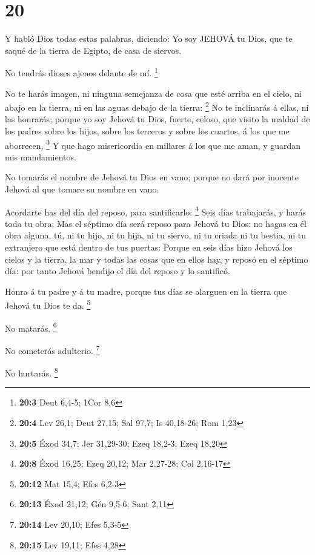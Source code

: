 \hypertarget{section-19}{%
\section{20}\label{section-19}}

 Y habló Dios todas estas palabras, diciendo: 
Yo soy JEHOVÁ tu Dios, que te saqué de la tierra de Egipto, de casa de
siervos.

 No tendrás dioses ajenos delante de mí. \footnote{\textbf{20:3}
  Deut 6,4-5; 1Cor 8,6}

 No te harás imagen, ni ninguna semejanza de cosa que esté
arriba en el cielo, ni abajo en la tierra, ni en las aguas debajo de la
tierra: \footnote{\textbf{20:4} Lev 26,1; Deut 27,15; Sal 97,7; Is
  40,18-26; Rom 1,23}  No te inclinarás á ellas, ni las
honrarás; porque yo soy Jehová tu Dios, fuerte, celoso, que visito la
maldad de los padres sobre los hijos, sobre los terceros y sobre los
cuartos, á los que me aborrecen, \footnote{\textbf{20:5} Éxod 34,7; Jer
  31,29-30; Ezeq 18,2-3; Ezeq 18,20}  Y que hago
misericordia en millares á los que me aman, y guardan mis mandamientos.

 No tomarás el nombre de Jehová tu Dios en vano; porque no
dará por inocente Jehová al que tomare su nombre en vano.

 Acordarte has del día del reposo, para santificarlo:
\footnote{\textbf{20:8} Éxod 16,25; Ezeq 20,12; Mar 2,27-28; Col 2,16-17}
 Seis días trabajarás, y harás toda tu obra; 
Mas el séptimo día será reposo para Jehová tu Dios: no hagas en él obra
alguna, tú, ni tu hijo, ni tu hija, ni tu siervo, ni tu criada ni tu
bestia, ni tu extranjero que está dentro de tus puertas: 
Porque en seis días hizo Jehová los cielos y la tierra, la mar y todas
las cosas que en ellos hay, y reposó en el séptimo día: por tanto Jehová
bendijo el día del reposo y lo santificó.

 Honra á tu padre y á tu madre, porque tus días se alarguen
en la tierra que Jehová tu Dios te da. \footnote{\textbf{20:12} Mat
  15,4; Efes 6,2-3}

 No matarás. \footnote{\textbf{20:13} Éxod 21,12; Gén
  9,5-6; Sant 2,11}

 No cometerás adulterio. \footnote{\textbf{20:14} Lev
  20,10; Efes 5,3-5}

 No hurtarás. \footnote{\textbf{20:15} Lev 19,11; Efes 4,28}

